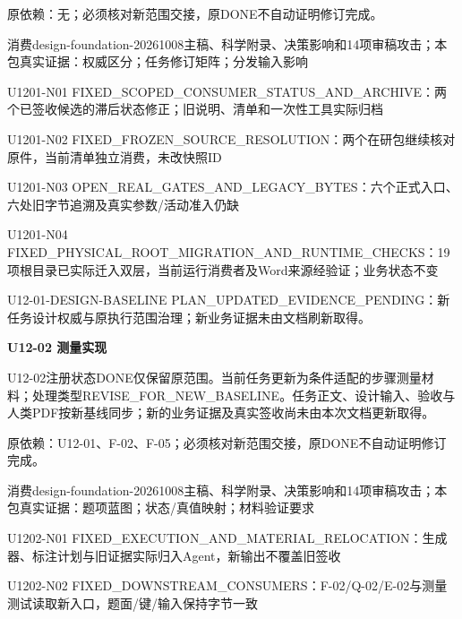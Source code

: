 \documentclass[11pt,a4paper]{article}
\newcommand{\reviewsection}[1]{\par\Needspace{5\baselineskip}\vspace{10pt}\begin{center}{\titlelatin\titlecjk\bfseries\fontsize{14}{20}\selectfont #1}\end{center}}
\begin{document}
原依赖：无；必须核对新范围交接，原DONE不自动证明修订完成。


消费design-\allowbreak{}foundation-\allowbreak{}20261008主稿、科学附录、决策影响和14项审稿攻击；本包真实证据：权威区分；任务修订矩阵；分发输入影响


U1201-\allowbreak{}N01 FIXED\_\allowbreak{}SCOPED\_\allowbreak{}CONSUMER\_\allowbreak{}STATUS\_\allowbreak{}AND\_\allowbreak{}ARCHIVE：两个已签收候选的滞后状态修正；旧说明、清单和一次性工具实际归档


U1201-\allowbreak{}N02 FIXED\_\allowbreak{}FROZEN\_\allowbreak{}SOURCE\_\allowbreak{}RESOLUTION：两个在研包继续核对原件，当前清单独立消费，未改快照ID


U1201-\allowbreak{}N03 OPEN\_\allowbreak{}REAL\_\allowbreak{}GATES\_\allowbreak{}AND\_\allowbreak{}LEGACY\_\allowbreak{}BYTES：六个正式入口、六处旧字节追溯及真实参数/\allowbreak{}活动准入仍缺


U1201-\allowbreak{}N04 FIXED\_\allowbreak{}PHYSICAL\_\allowbreak{}ROOT\_\allowbreak{}MIGRATION\_\allowbreak{}AND\_\allowbreak{}RUNTIME\_\allowbreak{}CHECKS：19项根目录已实际迁入双层，当前运行消费者及Word来源经验证；业务状态不变


U12-\allowbreak{}01-\allowbreak{}DESIGN-\allowbreak{}BASELINE PLAN\_\allowbreak{}UPDATED\_\allowbreak{}EVIDENCE\_\allowbreak{}PENDING：新任务设计权威与原执行范围治理；新业务证据未由文档刷新取得。


\reviewsection{U12-\allowbreak{}02 测量实现}
U12-\allowbreak{}02注册状态DONE仅保留原范围。当前任务更新为条件适配的步骤测量材料；处理类型REVISE\_\allowbreak{}FOR\_\allowbreak{}NEW\_\allowbreak{}BASELINE。任务正文、设计输入、验收与人类PDF按新基线同步；新的业务证据及真实签收尚未由本次文档更新取得。


原依赖：U12-\allowbreak{}01、F-\allowbreak{}02、F-\allowbreak{}05；必须核对新范围交接，原DONE不自动证明修订完成。


消费design-\allowbreak{}foundation-\allowbreak{}20261008主稿、科学附录、决策影响和14项审稿攻击；本包真实证据：题项蓝图；状态/\allowbreak{}真值映射；材料验证要求


U1202-\allowbreak{}N01 FIXED\_\allowbreak{}EXECUTION\_\allowbreak{}AND\_\allowbreak{}MATERIAL\_\allowbreak{}RELOCATION：生成器、标注计划与旧证据实际归入Agent，新输出不覆盖旧签收


U1202-\allowbreak{}N02 FIXED\_\allowbreak{}DOWNSTREAM\_\allowbreak{}CONSUMERS：F-\allowbreak{}02/\allowbreak{}Q-\allowbreak{}02/\allowbreak{}E-\allowbreak{}02与测量测试读取新入口，题面/\allowbreak{}键/\allowbreak{}输入保持字节一致
\end{document}
